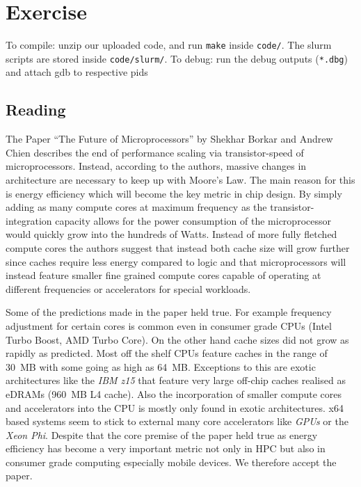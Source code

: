 \documentclass[]{scrartcl}
\newcommand{\exercise}{Exercise \thesection}
\begin{document}
\section*{\exercise}

To compile: unzip our uploaded code, and run \verb|make| inside \verb|code/|.
The slurm scripts are stored inside \verb|code/slurm/|.
To debug: run the debug outputs (\verb|*.dbg|) and attach gdb to respective pids

\subsection{Reading}

The Paper \enquote{The Future of Microprocessors} by Shekhar Borkar and Andrew Chien
describes the end of performance scaling via transistor-speed of microprocessors.
Instead, according to the authors, massive changes in architecture are necessary to keep
up with Moore's Law. The main reason for this is energy efficiency which will become the
key metric in chip design.
By simply adding as many compute cores at maximum frequency as the transistor-integration
capacity allows for the power consumption of the microprocessor would quickly grow into
the hundreds of Watts.
Instead of more fully fletched compute cores the authors suggest that instead both
cache size will grow further since caches require less energy compared to logic
and that microprocessors will instead feature smaller fine grained compute cores
capable of operating at different frequencies or accelerators for special workloads.

Some of the predictions made in the paper held true.
For example frequency adjustment for certain cores is common even in consumer grade CPUs
(Intel Turbo Boost, AMD Turbo Core).
On the other hand cache sizes did not grow as rapidly as predicted. Most off the shelf CPUs
feature caches in the range of \SI{30}{\mega B} with some going as high as \SI{64}{\mega B}.
Exceptions to this are exotic architectures like the \emph{IBM z15} that feature very large
off-chip caches realised as eDRAMs (\SI{960}{\mega B} L4 cache).
Also the incorporation of smaller compute cores and accelerators into the CPU is
mostly only found in exotic architectures. x64 based systems seem to stick to
external many core accelerators like \emph{GPUs} or the \emph{Xeon Phi}.
Despite that the core premise of the paper held true as energy efficiency has become
a very important metric not only in HPC but also in consumer grade computing
especially mobile devices.
We therefore accept the paper.
\end{document}
